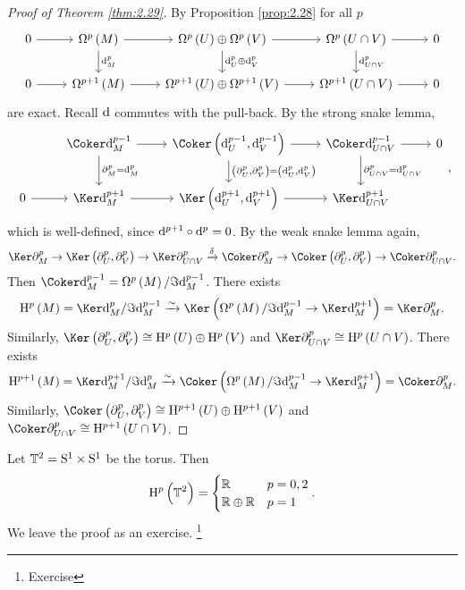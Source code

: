 \pagebreak

\begin{proof}[Proof of Theorem \ref{thm:2.29}]
By Proposition \ref{prop:2.28} for all $ p $
$$
\begin{tikzcd}
0 \arrow{r} & \Omega^p\br{M} \arrow{r} \arrow{d}{\d_M^p} & \Omega^p\br{U} \oplus \Omega^p\br{V} \arrow{r} \arrow{d}{\d_U^p \oplus \d_V^p} & \Omega^p\br{U \cap V} \arrow{r} \arrow{d}{\d_{U \cap V}^p} & 0 \\
0 \arrow{r} & \Omega^{p + 1}\br{M} \arrow{r} & \Omega^{p + 1}\br{U} \oplus \Omega^{p + 1}\br{V} \arrow{r} & \Omega^{p + 1}\br{U \cap V} \arrow{r} & 0
\end{tikzcd}
$$
are exact. Recall $ \mathrm{d} $ commutes with the pull-back. By the strong snake lemma,
$$
\begin{tikzcd}
& \Coker \d_M^{p - 1} \arrow{r} \arrow{d}{\partial_M^p = \d_M^p} & \Coker \br{\d_U^{p - 1}, \d_V^{p - 1}} \arrow{r} \arrow{d}{\br{\partial_U^p, \partial_V^p} = \br{\d_U^p, \d_V^p}} & \Coker \d_{U \cap V}^{p - 1} \arrow{r} \arrow{d}{\partial_{U \cap V}^p = \d_{U \cap V}^p} & 0 \\
0 \arrow{r} & \Ker \d_M^{p + 1} \arrow{r} & \Ker \br{\d_U^{p + 1}, \d_V^{p + 1}} \arrow{r} & \Ker \d_{U \cap V}^{p + 1} &
\end{tikzcd},
$$
which is well-defined, since $ \mathrm{d}^{p + 1} \circ \mathrm{d}^p = 0 $. By the weak snake lemma again,
$$ \Ker \partial_M^p \to \Ker \br{\partial_U^p, \partial_V^p} \to \Ker \partial_{U \cap V}^p \xrightarrow{\delta} \Coker \partial_M^p \to \Coker \br{\partial_U^p, \partial_V^p} \to \Coker \partial_{U \cap V}^p. $$
Then $ \Coker \d_M^{p - 1} = \Omega^p\br{M} / \Im \d_M^{p - 1} $. There exists
$$ \H^p\br{M} = \Ker \d_M^p / \Im \d_M^{p - 1} \xrightarrow{\sim} \Ker \br{\Omega^p\br{M} / \Im \d_M^{p - 1} \to \Ker \d_M^{p + 1}} = \Ker \partial_M^p. $$
Similarly, $ \Ker \br{\partial_U^p, \partial_V^p} \cong \H^p\br{U} \oplus \H^p\br{V} $ and $ \Ker \partial_{U \cap V}^p \cong \H^p\br{U \cap V} $. There exists
$$ \H^{p + 1}\br{M} = \Ker \d_M^{p + 1} / \Im \d_M^p \xrightarrow{\sim} \Coker \br{\Omega^p\br{M} / \Im \d_M^{p - 1} \to \Ker \d_M^{p + 1}} = \Coker \partial_M^p. $$
Similarly, $ \Coker \br{\partial_U^p, \partial_V^p} \cong \H^{p + 1}\br{U} \oplus \H^{p + 1}\br{V} $ and $ \Coker \partial_{U \cap V}^p \cong \H^{p + 1}\br{U \cap V} $.
\end{proof}


\begin{example}
Let $ \mathbb{T}^2 = \mathrm{S}^1 \times \mathrm{S}^1 $ be the torus. Then
$$ \H^p\br{\TT^2} =
\begin{cases}
\RR & p = 0, 2 \\
\RR \oplus \RR & p = 1
\end{cases}.
$$
We leave the proof as an exercise. \footnote{Exercise}
\end{example}

